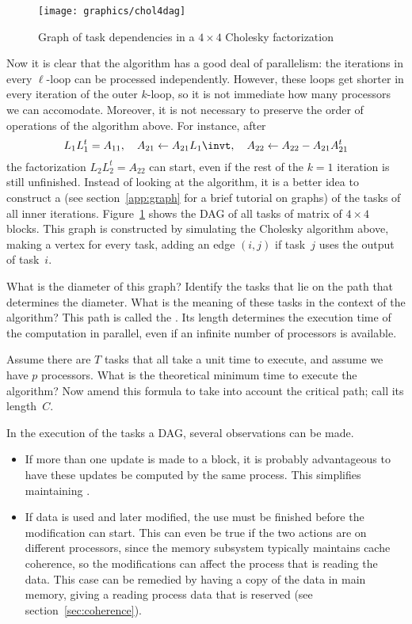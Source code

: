 \begin{figure}[ht]
\texttt{[image: graphics/chol4dag]}
  \caption{Graph of task dependencies in a $4\times4$ Cholesky
    factorization}
  \label{fig:chol4dag}
\end{figure}

Now it is clear that the algorithm has a good deal of parallelism: the
iterations in every $\ell$-loop can be processed independently.
However, these loops get shorter in every iteration of the outer
$k$-loop, so it is not immediate how many processors we can
accomodate. Moreover, it is not necessary to preserve the order of
operations of the algorithm above. For instance, after
\[
  L_1L_1^t=A_{11},\quad A_{21}\leftarrow A_{21}L_1\invt,\quad
  A_{22}\leftarrow A_{22}-A_{21}A_{21}^t
\]
the factorization $L_2L_2^t=A_{22}$ can start, even if the rest of the
$k=1$ iteration is still unfinished. Instead of looking at the
algorithm, it is a better idea to construct a  (see
section~\ref{app:graph} for a brief tutorial on graphs) of the tasks
of all inner iterations. Figure~\ref{fig:chol4dag} shows the \ac{DAG}
of all tasks of matrix of $4\times4$ blocks. This graph is constructed
by simulating the Cholesky algorithm above, making a vertex for every
task, adding an edge $(i,j)$ if task~$j$ uses the output of task~$i$.

\begin{exercise}
  What is the diameter of this graph? Identify the tasks that lie on
  the path that determines the diameter. What is the meaning of these
  tasks in the context of the algorithm? This path is called the
  . Its length determines the execution time of the
  computation in parallel, even if an infinite number of processors is
  available.
\end{exercise}

\begin{exercise}
  Assume there are $T$ tasks that all take a unit time to execute, and
  assume we have $p$ processors. What is the
  theoretical minimum time to execute the algorithm? Now amend this
  formula to take into account the critical path; call its length~$C$.
\end{exercise}

In the execution of the tasks a \ac{DAG}, several observations
can be made.
\begin{itemize}
\item If more than one update is made to a block, it is probably
  advantageous to have these updates be computed by the same
  process. This simplifies maintaining .
\item If data is used and later modified, the use must be finished
  before the modification can start. This can even be true if the two
  actions are on different processors, since the memory subsystem
  typically maintains cache coherence, so the modifications can affect the
  process that is reading the data. This case can be remedied by
  having a copy of the data in main memory, giving a reading process
  data that is reserved (see section~\ref{sec:coherence}).
\end{itemize}

